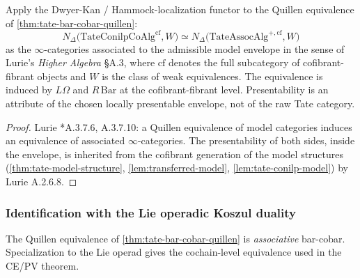 \begin{cor}
  \label{cor:tate-bar-cobar-infinity}
  Apply the Dwyer-Kan / Hammock-localization functor to the
  Quillen equivalence of \ref{thm:tate-bar-cobar-quillen}:
  $$N_\Delta\bigl(\mathrm{TateConilpCoAlg}^{\mathrm{cf}},W\bigr)
    \simeq
    N_\Delta\bigl(\mathrm{TateAssocAlg}^{+,\mathrm{cf}},W\bigr)$$
  as the $\infty$-categories associated to the admissible model
  envelope in the sense of Lurie's
  \emph{Higher Algebra} \S A.3, where $\mathrm{cf}$ denotes the
  full subcategory of cofibrant-fibrant objects and $W$ is the
  class of weak equivalences. The equivalence is induced by
  $L\Omega$ and $R\,\mathrm{Bar}$ at the cofibrant-fibrant level.
  Presentability is an attribute of the chosen locally presentable
  envelope, not of the raw Tate category.
\end{cor}

\begin{proof}
  Lurie \cite{lurie-ha}*{A.3.7.6, A.3.7.10}: a Quillen equivalence
  of model categories induces an equivalence of associated
  $\infty$-categories. The presentability of both sides, inside the
  envelope, is
  inherited from the cofibrant generation of the model structures
  (\ref{thm:tate-model-structure}, \ref{lem:transferred-model},
  \ref{lem:tate-conilp-model}) by Lurie A.2.6.8.
\end{proof}

\subsubsection{Identification with the Lie operadic Koszul duality}

The Quillen equivalence of \ref{thm:tate-bar-cobar-quillen} is
\emph{associative} bar-cobar. Specialization to the Lie operad
gives the cochain-level equivalence used in the CE/PV theorem.

